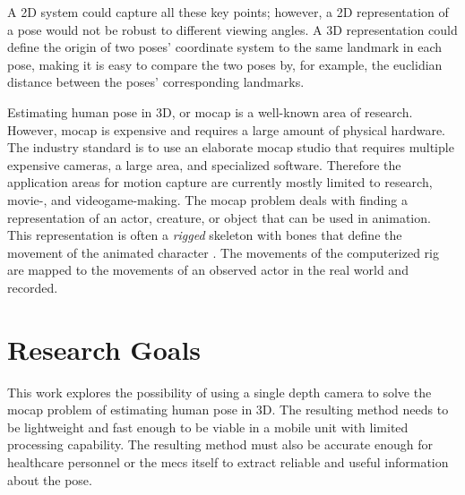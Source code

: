 A 2D system could capture all these key points; however, a 2D representation of a pose would not be robust to different viewing angles. A 3D representation could define the origin of two poses' coordinate system to the same landmark in each pose, making it is easy to compare the two poses by, for example, the euclidian distance between the poses' corresponding landmarks.

Estimating human pose in 3D, or \gls{mocap} is a well-known area of research. However, \gls{mocap} is expensive and requires a large amount of physical hardware. The industry standard is to use an elaborate \gls{mocap} studio that requires multiple expensive cameras, a large area, and specialized software. Therefore the application areas for motion capture are currently mostly limited to research, movie-, and videogame-making. The \gls{mocap} problem deals with finding a representation of an actor, creature, or object that can be used in animation. This representation is often a \emph{rigged} skeleton with bones that define the movement of the animated character \cite{skeletonAnimation}. The movements of the computerized rig are mapped to the movements of an observed actor in the real world and recorded.




\section{Research Goals}

This work explores the possibility of using a single depth camera to solve the \gls{mocap} problem of estimating human pose in 3D. The resulting method needs to be lightweight and fast enough to be viable in a mobile unit with limited processing capability. The resulting method must also be accurate enough for healthcare personnel or the \gls{mecs} itself to extract reliable and useful information about the pose.

